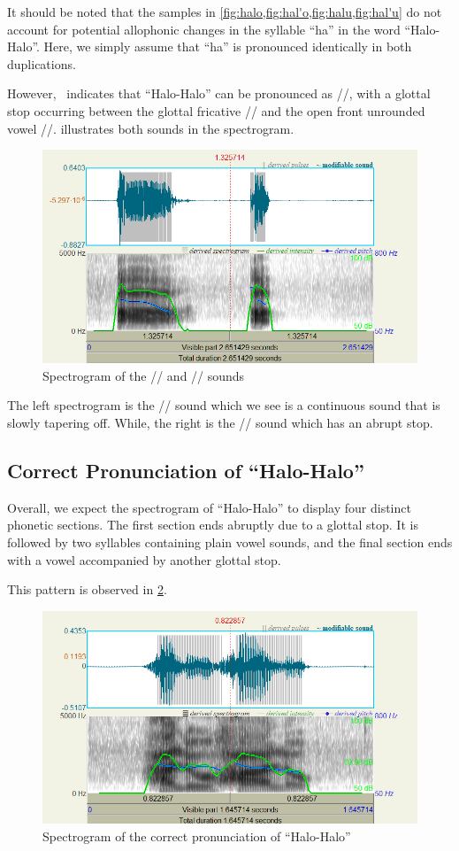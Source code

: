 \documentclass{article}
\begin{document}
It should be noted that the samples in
\cref{fig:halo,fig:hal'o,fig:halu,fig:hal'u} do not account for potential
allophonic changes in the syllable ``ha'' in the word ``Halo-Halo''. Here, we
simply assume that ``ha'' is pronounced identically in both duplications.

However,~\cite{KWF2015} indicates that ``Halo-Halo'' can be pronounced as
//, with a glottal stop occurring between the glottal
fricative // and the open front unrounded vowel //.
 illustrates both sounds in the spectrogram.

\begin{figure}
	\centering
	\includegraphics[width=0.65\linewidth]{img/a-a_.png}
	\caption{Spectrogram of the // and // sounds}\label{fig:a-a'}
\end{figure}

The left spectrogram is the // sound which we see is a continuous
sound that is slowly tapering off. While, the right is the // sound
which has an abrupt stop.

\subsection{Correct Pronunciation of ``Halo-Halo''}
Overall, we expect the spectrogram of ``Halo-Halo'' to display four distinct
phonetic sections. The first section ends abruptly due to a glottal stop. It is
followed by two syllables containing plain vowel sounds, and the final section
ends with a vowel accompanied by another glottal stop.

This pattern is observed in \cref{fig:correct}.

\begin{figure}
	\centering
	\includegraphics[width=0.65\linewidth]{img/correct.png}
	\caption{Spectrogram of the correct pronunciation of ``Halo-Halo''}\label{fig:correct}
\end{figure}
\end{document}
